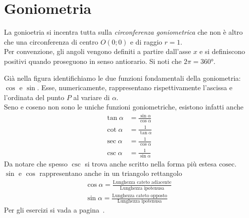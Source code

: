 
\section{Goniometria}\label{sec:goniometria}
La gonioetria si incentra tutta sulla \emph{circonferenza goniometrica} che non è altro che una
circonferenza di centro $O(0;0)$ e di raggio $r=1$.\\
Per convenzione, gli angoli vengono definiti a partire dall'asse $x$ e si definiscono positivi quando
proseguono in senso antiorario. Si noti che $2\pi = \ang{360}$.
\begin{center}
\end{center}
Già nella figura identifichiamo le due funzioni fondamentali della goniometria: $\cos$ e $\sin$. Esse,
numericamente, rappresentano rispettivamente l'ascissa e l'ordinata del punto $P$ al variare di 
$\alpha$.\\
Seno e coseno non sono le uniche funzioni goniometriche, esistono infatti anche
\begin{align*}
\tan\alpha &= \frac{\sin\alpha}{\cos\alpha}\\
\cot\alpha &= \frac{1}{\tan\alpha}\\
\sec\alpha &= \frac{1}{\cos\alpha}\\
\csc\alpha &= \frac{1}{\sin\alpha}
\end{align*}
Da notare che spesso $\csc$ si trova anche scritto nella forma più estesa $\mathrm{cosec}$.\\
$\sin$ e $\cos$ rappresentano anche in un triangolo rettangolo
\begin{gather*}
	\cos\alpha = \frac{\text{Lunghezza cateto adiacente}}{\text{Lunghezza ipotenusa}}\\
	\sin\alpha = \frac{\text{Lunghezza cateto opposto}}{\text{Lunghezza ipotenusa}}
\end{gather*}
Per gli esercizi si vada a pagina~\pageref{ex:goniometria}.

